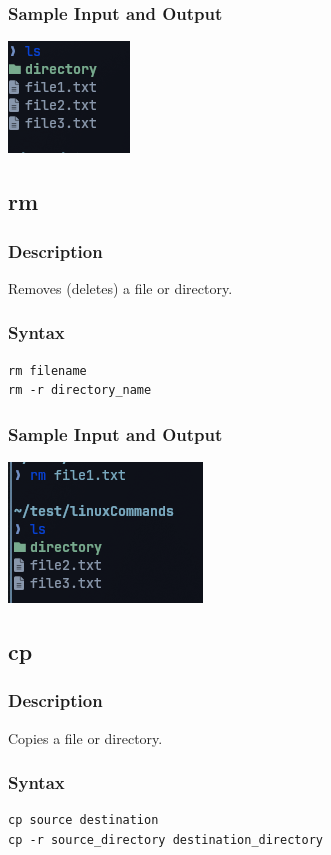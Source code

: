 \subsubsection{Sample Input and Output}
\includegraphics[]{Cycle_1//Outputs/ls1.png}


\subsection{rm}
\subsubsection{Description}
Removes (deletes) a file or directory.

\subsubsection{Syntax}
\begin{verbatim}
rm filename
rm -r directory_name
\end{verbatim}

\subsubsection{Sample Input and Output}
\includegraphics[]{Cycle_1//Outputs/rm.png}


\subsection{cp}
\subsubsection{Description}
Copies a file or directory.

\subsubsection{Syntax}
\begin{verbatim}
cp source destination
cp -r source_directory destination_directory
\end{verbatim}

